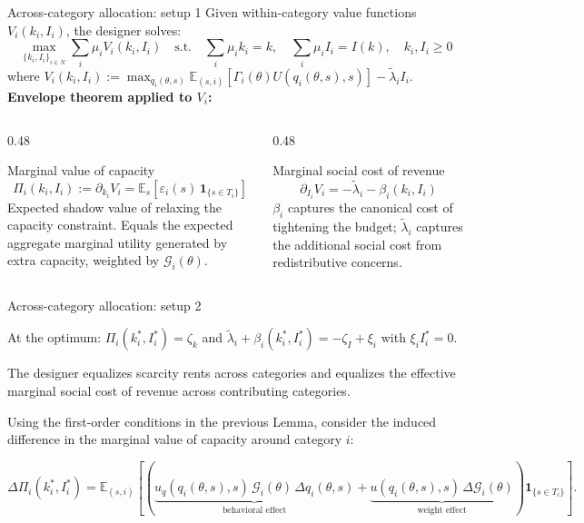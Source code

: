 \documentclass[10pt, aspectratio=169]{beamer}
\newcommand{\E}{\mathbb{E}}
\newcommand{\G}{\mathcal{G}}
\begin{document}
\begin{frame}{Across-category allocation: setup 1 }
Given within-category value functions $V_i(k_i, I_i)$, the designer solves:
\[ \max_{\{k_i, I_i\}_{i \in N}} \sum_i \mu_i V_i(k_i, I_i) \quad \text{s.t.} \quad \sum_i \mu_i k_i = k, \quad \sum_i \mu_i I_i = I(k), \quad k_i, I_i \geq 0 \]
where $V_i(k_i, I_i) := \max_{q_i(\theta,s)} \E_{(s,i)}[\Gamma_i(\theta)U(q_i(\theta,s),s)] - \tilde\lambda_i I_i$.
\vspace{0.2cm}
\textbf{Envelope theorem applied to $V_i$:}
\begin{columns}
\begin{column}{0.48\textwidth}
\begin{block}{Marginal value of capacity}
\[ \Pi_i(k_i,I_i) := \partial_{k_i} V_i = \E_s[\varepsilon_i(s)\,\mathbf{1}_{\{s \in T_i\}}] \]
Expected shadow value of relaxing the capacity constraint. Equals the expected aggregate marginal utility generated by extra capacity, weighted by $\G_i(\theta)$.
\end{block}
\end{column}
\begin{column}{0.48\textwidth}
\begin{block}{Marginal social cost of revenue}
\[ \partial_{I_i} V_i = -\tilde\lambda_i - \beta_i(k_i, I_i) \]
$\beta_i$ captures the canonical cost of tightening the budget; $\tilde\lambda_i$ captures the additional social cost from redistributive concerns.
\end{block}
\end{column}
\end{columns}

\end{frame}

\begin{frame}{Across-category allocation: setup 2}

\begin{lemma}
At the optimum: $\Pi_i(k_i^\ast,I_i^\ast) = \zeta_k$ and $\tilde\lambda_i + \beta_i(k_i^\ast,I_i^\ast) = -\zeta_I + \xi_i$ with $\xi_i I_i^\ast = 0$.
\end{lemma}

\vspace{0.2cm}

The designer equalizes scarcity rents across categories and equalizes the effective marginal social cost of revenue across contributing categories.

\vspace{0.2cm}

Using the first-order conditions in the previous Lemma, consider the induced difference in the marginal value of capacity around category \(i\):

\vspace{0.2cm}

\[
\Delta \Pi_i(k_i^\ast,I_i^\ast)
=
\E_{(s,i)}\![
(
\underbrace{u_q(q_i(\theta,s),s)\,\G_i(\theta)\,\Delta q_i(\theta,s)
}_{\text{behavioral effect}}+
\underbrace{u(q_i(\theta,s),s)\,\Delta \G_i(\theta)}_{\text{weight effect}}
)
\mathbf{1}_{\{s\in T_i\}}
].
\]
\end{frame}
\end{document}
